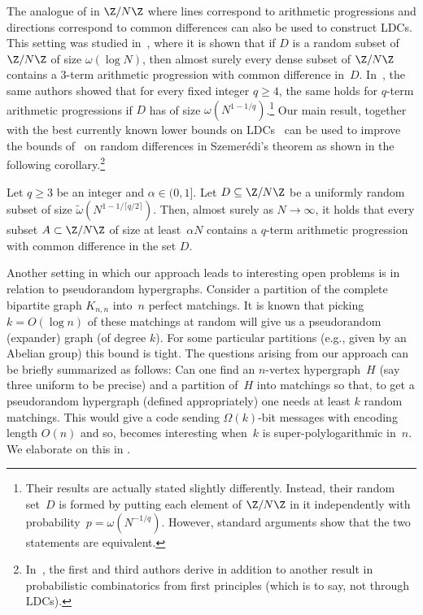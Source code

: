 \documentclass{toc}
\newcommand{\ceil}[1]{\lceil{#1}\rceil}
\begin{document}
The analogue of  in $\Z/N\Z$ where lines correspond to arithmetic progressions and directions correspond to common differences can also be used to construct LDCs. 
%
This setting was studied in~\cite{FLW12}, where it is shown that 
 if $D$ is a random subset of $\Z/N\Z$ of size $\omega(\log N)$, then almost surely every dense subset of $\Z/N\Z$ contains a $3$-term arithmetic progression with common difference in~$D$.
In~\cite{FLW16}, the same authors showed that for every fixed integer $q \geq 4$, the same holds for $q$-term arithmetic progressions if $D$ has of size $\omega(N^{1-1/q})$.\footnote{Their results are actually stated slightly differently.
Instead, their random set~$D$ is formed by putting each element of $\Z/N\Z$ in it independently with probability~$p = \omega(N^{-1/q})$.
However, standard arguments show that the two statements are equivalent.
}
%
Our main result, together with the best currently known lower bounds on LDCs~\cite{Kerenidis:2004,Woodruff:2007a} can be used to improve the bounds of~\cite{FLW16} on random differences in Szemer\'edi's theorem as shown in the following corollary.\footnote{In~\cite{BG:2018}, the first and third authors derive  in addition to another result in probabilistic combinatorics from first principles (which is to say, not through LDCs).}

%
\begin{corollary}\label{cor:Szrandom}
Let  $q \geq 3$ be an integer and $\alpha \in (0,1]$.
Let $D\subseteq \Z/N\Z$ be a uniformly random subset of size $\tilde\omega(N^{1-1/\ceil{q/2}})$.
Then, almost surely as $N\longrightarrow \infty$, it holds that every subset $A\subset \Z/N\Z$ of size at least~$\alpha N$ contains a $q$-term arithmetic progression with common difference in the set $D$.
%
%
\end{corollary}
%

Another setting in which our approach leads to interesting open problems is in relation to pseudorandom hypergraphs. Consider a partition of the complete bipartite graph $K_{n,n}$ into~$n$ perfect matchings. It is known that picking $k = O(\log n)$ of these matchings at random will give us a pseudorandom (expander) graph (of degree $k$). For some particular partitions (e.g., given by an Abelian group) 
 this bound is tight. The questions arising from our approach can be briefly summarized as follows: Can one find an $n$-vertex hypergraph~$H$ (say three uniform to be precise) and a partition of~$H$ into matchings so that, to get a pseudorandom hypergraph (defined appropriately) one needs  at least $k$  random matchings. This would give a code sending $\Omega(k)$-bit messages with encoding length $O(n)$ and so, becomes interesting when~$k$ is super-polylogarithmic in~$n$. %
 We elaborate on this in .
\end{document}
